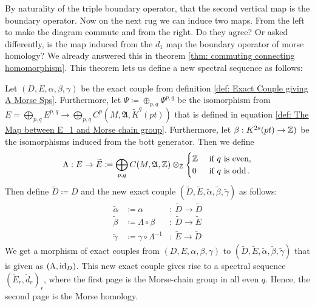 By naturality of the triple boundary operator, that the second vertical map is the boundary operator. Now on the next rug we can induce two maps. From the left to make the diagram commute and from the right. Do they agree? Or asked differently, is the map induced from the $d_1$ map the boundary operator of morse homology? We already answered this in theorem \ref{thm: commuting connecting homomorphism}. This theorem lets us define a new spectral sequence as follows:
\begin{definition}
	Let $(D,E,\alpha,\beta,\gamma)$ be the exact couple from definition \ref{def: Exact Couple giving A Morse Sps}. Furthermore, let $\Psi\coloneq \oplus _{p,q}\Psi^{p,q}$ be the isomorphism from $E=\bigoplus_{p,q} E^{p,q}\to \bigoplus_{p,q} C^{p}(M,\mathfrak{A},\widetilde{K}^q(pt))$ that is defined in equation \ref{def: The Map between E_1 and Morse chain group}. Furthermore, let $\beta:K^{2s}(pt)\to \mathbb{Z})$ be the isomorphisms induced from the bott generator. Then we define
	\begin{equation*}
		\Lambda: E \to \widetilde{E}\coloneq \bigoplus_{p,q} C(M,\mathfrak{A},\mathbb{Z}) \otimes_{\mathbb{Z}}
		\begin{cases}
			\mathbb{Z} &\text{ if $q$ is even,}\\
			0 &\text{ if $q$ is odd}\,.
		\end{cases}
	\end{equation*} Then define $\widetilde{D}\coloneq D$ and the new exact couple $(\widetilde{D},\widetilde{E},\widetilde{\alpha},\widetilde{\beta},\widetilde{\gamma})$ as follows:
	\begin{equation*}
		\begin{array}{lll}
			\widetilde{\alpha}&\coloneq\alpha                     &:~\widetilde{D} \to \widetilde{D}\\
			\widetilde{\beta} &\coloneq \Lambda \circ \beta       &:~\widetilde{D} \to \widetilde{E}\\
			\widetilde{\gamma}&\coloneq \gamma \circ \Lambda^{-1} &:~\widetilde{E} \to \widetilde{D}
		\end{array}
	\end{equation*} We get a morphism of exact couples from $(D,E, \alpha,\beta,\gamma)$ to $(\widetilde{D},\widetilde{E},\widetilde{\alpha},\widetilde{\beta},\widetilde{\gamma})$ that is given as $(\Lambda,\operatorname{\mathrm{id}}_D)$.
	This new exact couple gives rise to a spectral sequence $(\widetilde{E}_r,\widetilde{d}_r)_r$, where the first page is the Morse-chain group in all even $q$.
	Hence, the second page is the Morse homology.
\end{definition}

